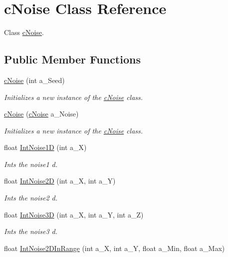 \hypertarget{classc_noise}{}\section{c\+Noise Class Reference}
\label{classc_noise}


Class \hyperlink{classc_noise}{c\+Noise}.  


\subsection*{Public Member Functions}
\begin{DoxyCompactItemize}
\item 
\hyperlink{classc_noise_a44626c294b22756496d6dd0884dd3406}{c\+Noise} (int a\+\_\+\+Seed)
\begin{DoxyCompactList}\small\item\em Initializes a new instance of the \hyperlink{classc_noise}{c\+Noise} class. \end{DoxyCompactList}\item 
\hyperlink{classc_noise_adbeed008318f12a15a5d77a50c4d3b2b}{c\+Noise} (\hyperlink{classc_noise}{c\+Noise} a\+\_\+\+Noise)
\begin{DoxyCompactList}\small\item\em Initializes a new instance of the \hyperlink{classc_noise}{c\+Noise} class. \end{DoxyCompactList}\item 
float \hyperlink{classc_noise_a581a875e1bde532a517c991f820362f2}{Int\+Noise1D} (int a\+\_\+X)
\begin{DoxyCompactList}\small\item\em Ints the noise1 d. \end{DoxyCompactList}\item 
float \hyperlink{classc_noise_ab49362af952295bfb3a4fa9f8c81422c}{Int\+Noise2D} (int a\+\_\+X, int a\+\_\+Y)
\begin{DoxyCompactList}\small\item\em Ints the noise2 d. \end{DoxyCompactList}\item 
float \hyperlink{classc_noise_a7215a1f4033f3094c03ce91871c1c93d}{Int\+Noise3D} (int a\+\_\+X, int a\+\_\+Y, int a\+\_\+Z)
\begin{DoxyCompactList}\small\item\em Ints the noise3 d. \end{DoxyCompactList}\item 
float \hyperlink{classc_noise_aee00ac876258c01fc0240ef2c069e390}{Int\+Noise2\+D\+In\+Range} (int a\+\_\+X, int a\+\_\+Y, float a\+\_\+\+Min, float a\+\_\+\+Max)

\end{DoxyCompactItemize}
